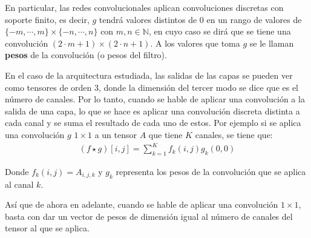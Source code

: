 En particular, las redes convolucionales aplican convoluciones discretas con soporte finito, es decir, $g$  tendrá valores distintos de $0$ en un rango de valores de $\{-m,\cdots ,m\}\times\{-n,\cdots ,n\}$ con $m,n\in\mathbb{N}$, en cuyo caso se dirá que se tiene una convolución $(2 \cdot m + 1) \times (2 \cdot n + 1)$. A los valores que toma $g$ se le llaman \textbf{pesos} de la convolución (o pesos del filtro). 

En el caso de la arquitectura estudiada, las salidas de las capas se pueden ver como tensores de orden 3, donde la dimensión del tercer modo se dice que es el número de canales. Por lo tanto, cuando se hable de aplicar una convolución a la salida de una capa, lo que se hace es aplicar una convolución discreta distinta a cada canal y se suma el resultado de cada uno de estos. Por ejemplo si se aplica una convolución $g$ $1\times 1$ a un tensor $A$ que tiene $K$ canales, se tiene que:
\begin{align} \label{eq:filtroAplicado}
(f\star g)[i,j] = \sum_{k=1}^{K}f_k(i,j)g_k(0,0)
\end{align}

Donde $f_k(i,j) = A_{i,j,k}$ y $g_k$ representa los pesos de la convolución que se aplica al canal $k$.

Así que de ahora en adelante, cuando se hable de aplicar una convolución $1\times 1$, basta con dar un vector de pesos de dimensión igual al número de canales del tensor al que se aplica.

